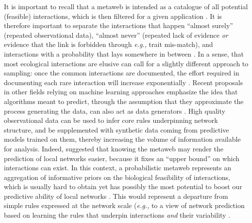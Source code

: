It is important to recall that a metaweb is intended as a catalogue of
all potential (feasible) interactions, which is then filtered for a
given application \cite{Morales-Castilla2015Inferring}. It is therefore
important to separate the interactions that happen ``almost surely''
(repeated observational data), ``almost never'' (repeated lack of
evidence \emph{or} evidence that the link is forbidden through
\emph{e.g.,} trait mis-match), and interactions with a probability that
lays somewhere in between \cite{Catchen2023Missing}. In a sense, that
most ecological interactions are elusive can call for a slightly
different approach to sampling: once the common interactions are
documented, the effort required in documenting each rare interaction
will increase exponentially \cite{Jordano2016Sampling}. Recent proposals
in other fields relying on machine learning approaches emphasize the
idea that algorithms meant to predict, through the assumption that they
approximate the process generating the data, can also act as data
generators \cite{Hoffmann2019Machine}. High quality observational data
can be used to infer core rules underpinning network structure, and be
supplemented with synthetic data coming from predictive models trained
on them, thereby increasing the volume of information available for
analysis. Indeed, \cite{Strydom2021Roadmap} suggested that knowing the metaweb
may render the prediction of local networks easier, because it fixes an
``upper bound'' on which interactions can exist. In this context, a
probabilistic metaweb represents an aggregation of informative priors on
the biological feasibility of interactions, which is usually hard to
obtain yet has possibly the most potential to boost our predictive
ability of local networks \cite{Bartomeus2013Understanding,
Bartomeus2016Common}. This would represent a departure from simple
rules expressed at the network scale (\emph{e.g.,} \cite{Williams2000Simple} to
a view of network prediction based on learning the rules that underpin
interactions \emph{and} their variability
\cite{Gupta2022Simultaneously}.

